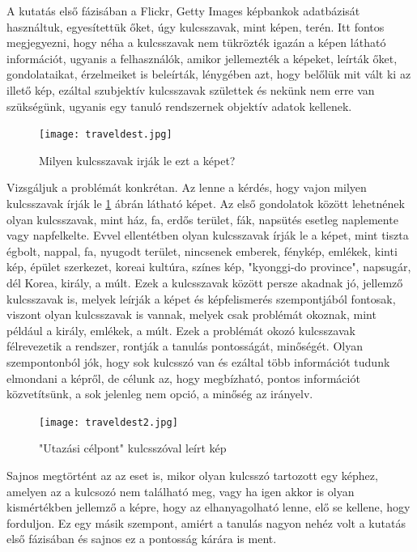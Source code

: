 \documentclass[12pt, a4paper, oneside]{book}
\theoremstyle{tetel}
\begin{document}
	A kutatás első fázisában a Flickr\cite{1}, Getty Images\cite{2} képbankok adatbázisát használtuk, egyesítettük őket, úgy kulcsszavak, mint képen, terén. Itt fontos megjegyezni, hogy néha a kulcsszavak nem tükrözték igazán a képen látható információt, ugyanis a felhasználók, amikor jellemezték a képeket, leírták őket, gondolataikat, érzelmeiket is beleírták, lénygében azt, hogy belőlük mit vált ki az illető kép, ezáltal szubjektív kulcsszavak születtek és nekünk nem erre van szükségünk, ugyanis egy tanuló rendszernek objektív adatok kellenek.

\vspace{0.3cm}
\begin{figure}[h]
\begin{center}
\texttt{[image: traveldest.jpg]}
\caption{{Milyen kulcsszavak irják le ezt a képet?}}
\label{traveldest}
\end{center}
\end{figure}

	Vizsgáljuk a problémát konkrétan. Az lenne a kérdés, hogy vajon milyen kulcsszavak írják le \ref{traveldest} ábrán látható képet. Az első gondolatok között lehetnének olyan kulcsszavak, mint ház, fa, erdős terület, fák, napsütés esetleg naplemente vagy napfelkelte. Evvel ellentétben olyan kulcsszavak írják le a képet, mint tiszta égbolt, nappal, fa, nyugodt terület, nincsenek emberek, fénykép, emlékek, kinti kép, épület szerkezet, koreai kultúra, színes kép, "kyonggi-do province", napsugár, dél Korea, király, a múlt. 
	Ezek a kulcsszavak között persze akadnak jó, jellemző kulcsszavak is, melyek leírják a képet és képfelismerés szempontjából fontosak, viszont olyan kulcsszavak is vannak, melyek csak problémát okoznak, mint például a király, emlékek, a múlt. Ezek a problémát okozó kulcsszavak félrevezetik a rendszer, rontják a tanulás pontosságát, minőségét. Olyan szempontonból jók, hogy sok kulcsszó van és ezáltal több információt tudunk elmondani a képről, de célunk az, hogy megbízható, pontos információt közvetítsünk, a sok jelenleg nem opció, a minőség az irányelv.

\vspace{0.4cm}
\begin{figure}[h]
\begin{center}
\texttt{[image: traveldest2.jpg]}
\caption{{"Utazási célpont" kulcsszóval leírt kép}}
\label{traveldest2}
\end{center}
\end{figure}

	Sajnos megtörtént az az eset is, mikor olyan kulcsszó tartozott egy képhez, amelyen az a kulcsozó nem található meg, vagy ha igen akkor is olyan kismértékben jellemző a képre, hogy az elhanyagolható lenne, elő se kellene, hogy forduljon. Ez egy másik szempont, amiért a tanulás nagyon nehéz volt a kutatás első fázisában és sajnos ez a pontosság kárára is ment. 
\end{document}
